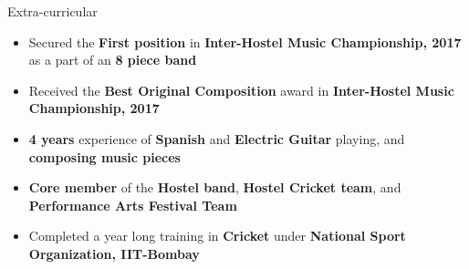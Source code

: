 \documentclass{resume}
\newcommand{\sepval}{-0.5em}
\begin{document}
\begin{rSection}{Extra-curricular}

\begin{itemize}[leftmargin=*]

	\itemsep \sepval

	\item Secured the {\bf First position} in {\bf{Inter-Hostel Music Championship, 2017}} as a part of an {\bf{8 piece band}}
	
	\item Received the {\bf Best Original Composition} award in {\bf{Inter-Hostel Music Championship, 2017}} 

	\item {\bf{4 years}} experience of {\bf Spanish} and {\bf Electric Guitar} playing, and {\bf composing music pieces}
	
	\item {\bf Core member} of the {\bf Hostel band}, {\bf Hostel Cricket team}, and {\bf Performance Arts Festival Team}

	\item Completed a year long training in {\bf Cricket} under {\bf  National Sport Organization, IIT-Bombay}

\end{itemize}

\end{rSection}
\end{document}
